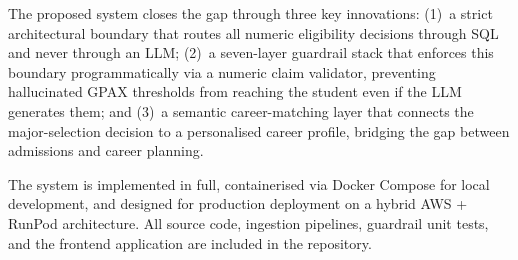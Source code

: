 ﻿\documentclass[12pt,a4paper]{article}
\begin{document}
The proposed system closes the gap through three key innovations: (1)~a strict
architectural boundary that routes all numeric eligibility decisions through SQL and
never through an LLM; (2)~a seven-layer guardrail stack that enforces this boundary
programmatically via a numeric claim validator, preventing hallucinated GPAX
thresholds from reaching the student even if the LLM generates them; and (3)~a
semantic career-matching layer that connects the major-selection decision to a
personalised career profile, bridging the gap between admissions and career planning.

The system is implemented in full, containerised via Docker Compose for local
development, and designed for production deployment on a hybrid AWS + RunPod
architecture. All source code, ingestion pipelines, guardrail unit tests, and the
frontend application are included in the repository.
\end{document}
